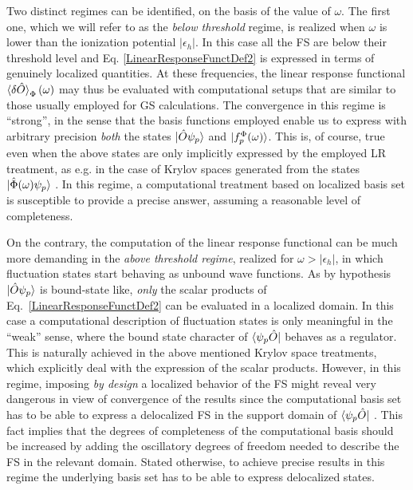 \documentclass[reprint,aps,prb]{revtex4-1}
\newcommand{\eps}{\epsilon}
\newcommand{\op}[1]{\hat {#1}}
\begin{document}
Two distinct regimes can be identified, on the basis of the value of $\omega$.
The first one, which we will refer to as the \emph{below threshold} regime, is realized when
$\omega$ is lower than the ionization potential $|\eps_h|$.
In this case all the FS are below their threshold level and Eq. \eqref{LinearResponseFunctDef2}
is expressed in terms of genuinely localized
quantities. At these frequencies, the linear response functional $\braket{\delta\op O}_\Phi(\omega)$
may thus be evaluated with computational setups that
are similar to those usually employed for GS calculations.
The convergence in this regime is ``strong'', in the sense that the basis functions employed enable us to express
with arbitrary precision \emph{both} the states $\ket{\op O \psi_p}$ and $\ket{f_p^\Phi(\omega)}$.
This is, of course, true even when the above states are only implicitly expressed by the employed LR treatment, as e.g. in the case of Krylov spaces generated from the states $\ket{\op\Phi(\omega) \psi_p}$ \cite{baroni2006,baroni2008,linlinKPM}.
In this regime, a computational treatment based on localized basis set is susceptible to provide a precise answer, assuming a reasonable level of completeness.

On the contrary, the computation of the linear response functional can be much more demanding in the \emph{above threshold regime},
realized for $\omega>|\eps_h|$, in which fluctuation states start behaving as unbound wave functions.
As by hypothesis $\ket{\op O \psi_p}$ is bound-state like, \emph{only} the scalar products of Eq.~\eqref{LinearResponseFunctDef2}
can be evaluated in a localized domain. In this case a computational description of fluctuation states is only meaningful in the ``weak''
sense, where the bound state character of $\bra{\psi_p\op O}$ behaves as a regulator. This is naturally achieved in the above mentioned
Krylov space treatments, which explicitly deal with the expression of the scalar products. However, in this regime, imposing \emph{by design}
a localized behavior of the FS might reveal very dangerous in view of convergence of the results since the computational basis set has
to be able to express a delocalized FS in the support domain of $\bra{\psi_p\op O}$ .
This fact implies that the degrees of completeness of the computational basis should be increased by adding
the oscillatory degrees of freedom needed to describe the FS in the relevant domain.
Stated otherwise, to achieve precise results in this regime the
underlying basis set has to be able to express delocalized states.
\end{document}
